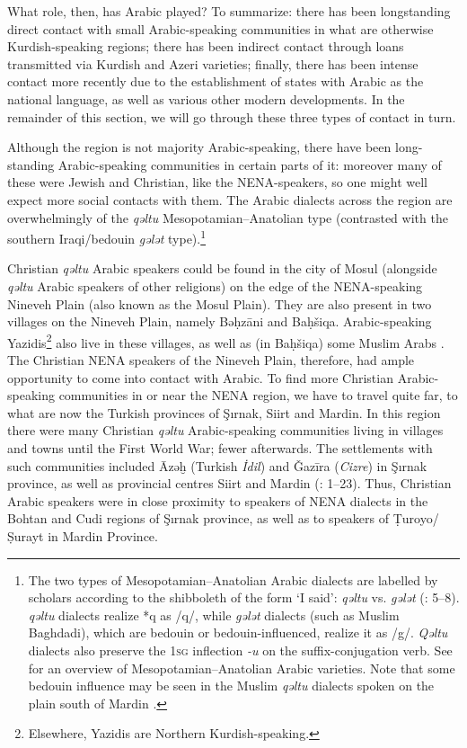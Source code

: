 \documentclass[output=paper]{langsci/langscibook}
\begin{document}
What role, then, has Arabic played? To summarize: there has been longstanding direct contact with small Arabic-speaking communities in what are otherwise Kurdish-speaking regions; there has been indirect contact through loans transmitted via Kurdish and Azeri varieties; finally, there has been intense contact more recently due to the establishment of states with Arabic as the national language, as well as various other modern developments. In the remainder of this section, we will go through these three types of contact in turn.

Although the region is not majority Arabic-speaking, there have been long-standing Arabic-speaking communities in certain parts of it: moreover many of these were Jewish and Christian, like the NENA-speakers, so one might well expect more social contacts with them. The Arabic dialects across the region are overwhelmingly of the \textit{qəltu} Mesopotamian–Anatolian type (contrasted with the southern Iraqi/bedouin \textit{gələt} type).\footnote{The two types of Mesopotamian–Anatolian Arabic dialects are labelled by scholars according to the shibboleth of the form ‘I said’: \textit{qəltu} vs. \textit{gələt} (\citealt{Blanc1964}: 5–8). \textit{qəltu} dialects realize *q as /q/, while \textit{gələt} dialects (such as Muslim Baghdadi), which are bedouin or bedouin-influenced, realize it as /g/. \textit{Qəltu} dialects also preserve the 1\textsc{sg} inflection \textit{-u} on the suffix-conjugation verb. See \citet{Talay2011} for an overview of Mesopotamian--Anatolian Arabic varieties. Note that some bedouin influence may be seen in the Muslim \textit{qəltu} dialects spoken on the plain south of Mardin \citep[30]{Jastrow1978}.}

Christian \textit{qəltu} Arabic speakers could be found in the city of Mosul (alongside \textit{qəltu} Arabic speakers of other religions) on the edge of the NENA-speaking Nineveh Plain (also known as the Mosul Plain). They are also present in two villages on the Nineveh Plain, namely Bəḥzāni and Baḥšiqa. Arabic-speaking Yazidis\footnote{Elsewhere, Yazidis are Northern Kurdish-speaking.} also live in these villages, as well as (in Baḥšiqa) some Muslim Arabs \citep[24]{Jastrow1978}. The Christian NENA speakers of the Nineveh Plain, therefore, had ample opportunity to come into contact with Arabic. To find more Christian Arabic-speaking communities in or near the NENA region, we have to travel quite far, to what are now the Turkish provinces of Şırnak, Siirt and Mardin. In this region there were many Christian \textit{qəltu} Arabic-speaking communities living in villages and towns until the First World War; fewer afterwards. The settlements with such communities included Āzəḫ (Turkish \textit{İdil}) and Ǧazīra (\textit{Cizre}) in Şırnak province, as well as provincial centres Siirt and Mardin (\citealt{Jastrow1978}: 1–23). Thus, Christian Arabic speakers were in close proximity to speakers of NENA dialects in the Bohtan and Cudi regions of Şırnak province, as well as to speakers of Ṭuroyo/Ṣurayt in Mardin Province.
\end{document}
